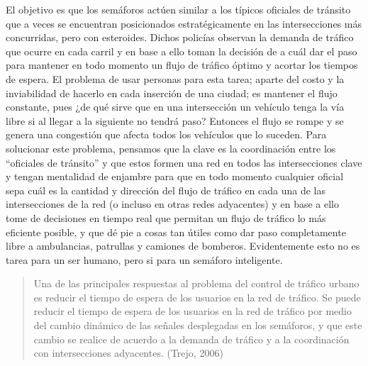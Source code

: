 El objetivo es que los semáforos actúen similar a los típicos oficiales
de tránsito que a veces se encuentran posicionados estratégicamente en
las intersecciones más concurridas, pero con esteroides. Dichos policías
observan la demanda de tráfico que ocurre en cada carril y en base a
ello toman la decisión de a cuál dar el paso para mantener en todo
momento un flujo de tráfico óptimo y acortar los tiempos de espera. El
problema de usar personas para esta tarea; aparte del costo y la
inviabilidad de hacerlo en cada inserción de una ciudad; es mantener el
flujo constante, pues ¿de qué sirve que en una intersección un vehículo
tenga la vía libre si al llegar a la siguiente no tendrá paso? Entonces
el flujo se rompe y se genera una congestión que afecta todos los
vehículos que lo suceden. Para solucionar este problema, pensamos que la
clave es la coordinación entre los ``oficiales de tránsito'' y que estos
formen una red en todos las intersecciones clave y tengan mentalidad de
enjambre para que en todo momento cualquier oficial sepa cuál es la
cantidad y dirección del flujo de tráfico en cada una de las
intersecciones de la red (o incluso en otras redes adyacentes) y en base
a ello tome de decisiones en tiempo real que permitan un flujo de
tráfico lo más eficiente posible, y que dé pie a cosas tan útiles como
dar paso completamente libre a ambulancias, patrullas y camiones de
bomberos. Evidentemente esto no es tarea para un ser humano, pero si
para un semáforo inteligente.

\begin{quote}
Una de las principales respuestas al problema del control de tráfico
urbano es reducir el tiempo de espera de los usuarios en la red de
tráfico. Se puede reducir el tiempo de espera de los usuarios en la red
de tráfico por medio del cambio dinámico de las señales desplegadas en
los semáforos, y que este cambio se realice de acuerdo a la demanda de
tráfico y a la coordinación con intersecciones adyacentes. (Trejo, 2006)
\end{quote}

